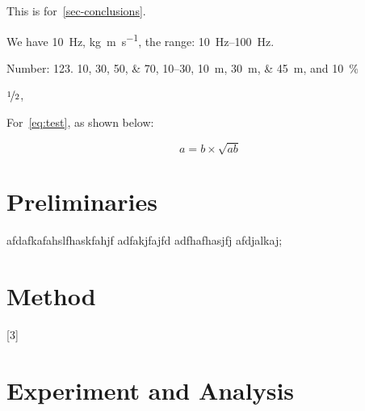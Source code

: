 \documentclass{amsart}
\theoremstyle{definition}
\theoremstyle{remark}
\numberwithin{equation}{section}
\begin{document}
This is for~\cref{sec-conclusions}.


%

We have  \SI{10}{\hertz},
\si{\kilogram\metre\per\second},
the range: \SIrange{10}{100}{\hertz}.

Number:
\num{123}.
\numlist{10;30;50;70},
\numrange{10}{30},
\SIlist{10;30;45}{\metre},
and
\SI{10}{\percent}

$\nicefrac[]{1}{2}$,



For~\cref{eq:test},
as shown below:

\begin{equation}\label{eq:test}
a = b \times \sqrt{ab}
\end{equation}

\section{Preliminaries} \label{sec-preliminaries}

\lipsum


afdafkafahslfhaskfahjf   
adfakjfajfd  adfhafhasjfj 
afdjalkaj;
%


\section{Method} \label{sec-method}

 
 
 
 
 
 
 
\Blinddocument 

\blindtext

[3]

\blinditemize
\blindenumerate

\blindmathtrue

\blinddescription



\section{Experiment and Analysis} \label{sec-experiment}
\end{document}
